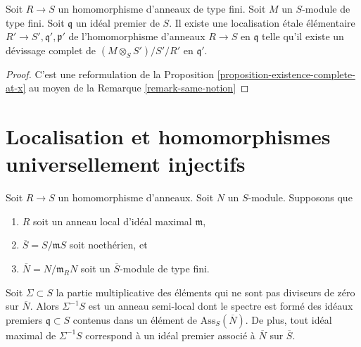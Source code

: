\begin{lemma}
\label{lemma-existence-algebra}
Soit $R \to S$ un homomorphisme d'anneaux de type fini.
Soit $M$ un $S$-module de type fini.
Soit $\mathfrak q$ un idéal premier de $S$.
Il existe une localisation \'etale élémentaire
$R' \to S', \mathfrak q', \mathfrak p'$ de
l'homomorphisme d'anneaux $R \to S$ en $\mathfrak q$ telle qu'il
existe un d\'evissage complet de
$(M \otimes_S S')/S'/R'$ en $\mathfrak q'$.
\end{lemma}

\begin{proof}
C'est une reformulation de la
Proposition \ref{proposition-existence-complete-at-x}
au moyen de la
Remarque \ref{remark-same-notion}
\end{proof}




\section{Localisation et homomorphismes universellement injectifs}
\label{section-localize-universally-injective}


\begin{lemma}
\label{lemma-homothety-spectrum}
Soit $R \to S$ un homomorphisme d'anneaux.
Soit $N$ un $S$-module.
Supposons que
\begin{enumerate}
\item $R$ soit un anneau local d'idéal maximal $\mathfrak m$,
\item $\overline{S} = S/\mathfrak m S$ soit noethérien, et
\item $\overline{N} = N/\mathfrak m_R N$ soit un $\overline{S}$-module de type fini.
\end{enumerate}
Soit $\Sigma \subset S$ la partie multiplicative des éléments qui ne sont pas
diviseurs de zéro sur $\overline{N}$. Alors $\Sigma^{-1}S$ est un anneau semi-local
dont le spectre est formé des idéaux premiers $\mathfrak q \subset S$ contenus dans un
élément de $\text{Ass}_S(\overline{N})$. De plus, tout idéal
maximal de $\Sigma^{-1}S$ correspond à un idéal premier associé à
$\overline{N}$ sur $\overline{S}$.
\end{lemma}

